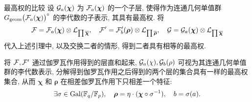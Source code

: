 \documentclass[aspectratio=169,handout]{ctexbeamer}
\renewcommand\emph[1]{{\color{structure.fg!50!blue}{#1}}}
\newcommand\bchi{{\boldsymbol\chi}}
\newcommand\brho{{\boldsymbol\rho}}
\begin{document}
\begin{frame}{最高权的比较}
设 $\CG_a(\bchi)$ 为 $\CF_a(\bchi)$ 的一个子层, 使得作为连通几何单值群 $G_\geom\bigl(\CF_a(\bchi)\bigr)^\circ$ 的李代数的子表示, 其具有最高权.
将
\[\CF=\CF_a(\bchi)\otimes\CL_{\prod\ov \bchi},\quad
\CF'=\CF'_b(\brho)\otimes\CL_{\prod\ov \brho},\quad
\CG=\CG_a(\bchi)\otimes\CL_{\prod\ov \bchi}\]
代入上述引理中, 以及交换二者的情形, 得到二者具有相等的最高权.

将 ${\mathcal{F}},{\mathcal{F}}'$ 通过伽罗瓦作用得到的层直和起来, ${\mathcal{G}}_a(\chi),{\mathcal{G}}_b(\rho)$ 可视为其连通几何单值群的李代数表示, 分解得到伽罗瓦作用之后得到的两个层的集合具有一样的最高权集合, 从而 $\bchi$ 和 $\brho$ 在相差伽罗瓦作用下只相差一个特征:
\[\exists\sigma\in\Gal(\BF_q/\BF_p),\quad\brho=\eta\cdot(\bchi\circ \sigma^{-1}),\quad b=\sigma(a).\]
\end{frame}










\end{document}
